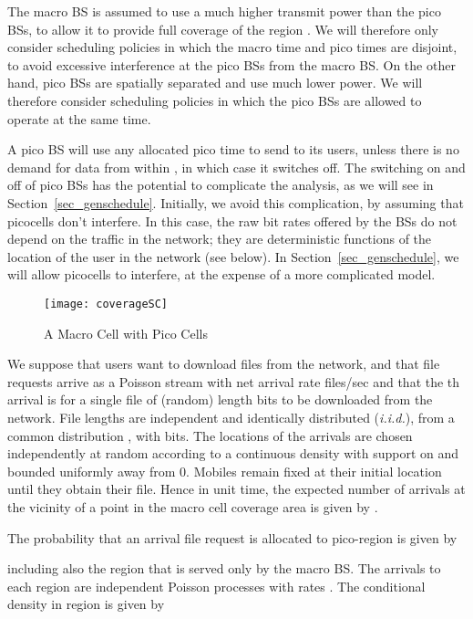 \documentclass[12pt, draftcls, onecolumn]{IEEEtranTCOM}
\begin{document}
The macro BS is assumed to use a much higher transmit power than the pico BSs, to allow it to provide
full coverage of the region . We will therefore only consider scheduling policies in which the
macro time and pico times are disjoint, to avoid excessive interference at the pico BSs from the macro BS. On the other hand, pico BSs are spatially separated and use much lower power. We will therefore consider scheduling policies in which the pico BSs are allowed to operate at the same time.

A pico BS  will use any allocated pico time to send to its users, unless there is no demand for data from within , in
which case it switches off. The switching on and off of pico BSs has the potential to complicate the analysis, as we will see in Section~\ref{sec_genschedule}. Initially, we avoid this complication, by assuming that picocells don't interfere. In this case, the raw bit rates offered by the BSs
do not depend on the traffic in the network; they are deterministic functions of the location of the user in the network (see below). In Section~\ref{sec_genschedule}, we will allow picocells to interfere, at the expense of a more complicated model.

\begin{figure}
\centering
\texttt{[image: coverageSC]}
\caption{A Macro Cell with  Pico Cells}
\label{fig_macropico}
\end{figure}




We suppose that users want to download files from the network, and that file requests arrive as a Poisson stream with net arrival
rate  files/sec and that the th arrival is for a single file of (random) length  bits to
be downloaded from the network. File lengths are independent and identically distributed ({\it i.i.d.}), from a common distribution , with  bits. The locations of the arrivals are chosen
independently at random according to a continuous density 
with support on  and bounded uniformly away from 0. Mobiles remain
fixed at their initial location until they obtain their file. Hence
in unit time, the expected number of arrivals at the vicinity of a point
 in the macro cell coverage area  is given by
. 

The probability that an arrival file request is allocated to pico-region  is given by

including also the region  that is served only by the macro BS.
The arrivals to each region are independent Poisson processes with rates . The conditional density in region  is given by
\end{document}
